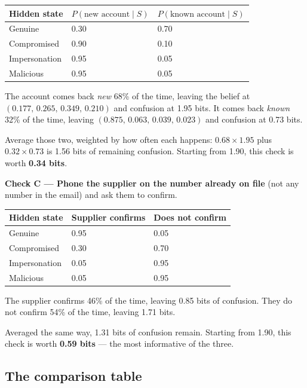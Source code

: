 \documentclass[11pt,a4paper]{article}
\begin{document}
\begin{center}
\begin{tabular}{@{}L{4.0cm}C{3.2cm}C{3.4cm}@{}}
\toprule
\textbf{Hidden state} & $P(\text{new account}\mid S)$ & $P(\text{known account}\mid S)$ \\
\midrule
Genuine       & 0.30 & 0.70 \\
Compromised   & 0.90 & 0.10 \\
Impersonation & 0.95 & 0.05 \\
Malicious     & 0.95 & 0.05 \\
\bottomrule
\end{tabular}
\end{center}

The account comes back \emph{new} 68\% of the time, leaving the belief at
$(0.177,\, 0.265,\, 0.349,\, 0.210)$ and confusion at 1.95 bits. It comes back \emph{known} 32\%
of the time, leaving $(0.875,\, 0.063,\, 0.039,\, 0.023)$ and confusion at 0.73 bits.

Average those two, weighted by how often each happens: $0.68 \times 1.95$ plus
$0.32 \times 0.73$ is 1.56 bits of remaining confusion. Starting from 1.90, this check is worth
\textbf{0.34 bits}.

\textbf{Check C --- Phone the supplier on the number already on file} (not any number in the
email) and ask them to confirm.

\begin{center}
\begin{tabular}{@{}L{4.0cm}C{3.2cm}C{3.4cm}@{}}
\toprule
\textbf{Hidden state} & \textbf{Supplier confirms} & \textbf{Does not confirm} \\
\midrule
Genuine       & 0.95 & 0.05 \\
Compromised   & 0.30 & 0.70 \\
Impersonation & 0.05 & 0.95 \\
Malicious     & 0.05 & 0.95 \\
\bottomrule
\end{tabular}
\end{center}

The supplier confirms 46\% of the time, leaving 0.85 bits of confusion. They do not confirm 54\%
of the time, leaving 1.71 bits.

Averaged the same way, 1.31 bits of confusion remain. Starting from 1.90, this check is worth
\textbf{0.59 bits} --- the most informative of the three.

\subsection{The comparison table}
\end{document}
